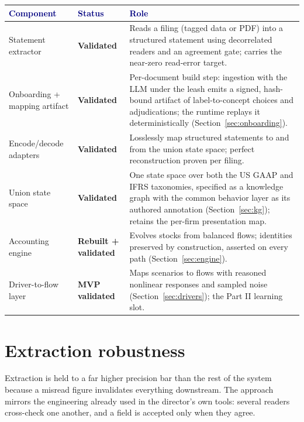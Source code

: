 \documentclass[11pt]{article}
\newcommand{\headtext}[1]{\textcolor{navy}{\textbf{#1}}}
\begin{document}
\noindent\begin{minipage}{\linewidth}
\renewcommand{\arraystretch}{1.12}
\begin{tabularx}{\linewidth}{>{\raggedright\arraybackslash}p{3.2cm} >{\raggedright\arraybackslash}p{2.6cm} X}
\hline
\rowcolor{tblhead} \headtext{Component} & \headtext{Status} & \headtext{Role} \\ \hline
Statement extractor & \textbf{\textcolor{fgreen}{Validated}} & Reads a filing (tagged data or PDF) into a structured statement using decorrelated readers and an agreement gate; carries the near-zero read-error target. \\ \hline
Onboarding + mapping artifact & \textbf{\textcolor{fgreen}{Validated}} & Per-document build step: ingestion with the LLM under the leash emits a signed, hash-bound artifact of label-to-concept choices and adjudications; the runtime replays it deterministically (Section~\ref{sec:onboarding}). \\ \hline
Encode/decode adapters & \textbf{\textcolor{fgreen}{Validated}} & Losslessly map structured statements to and from the union state space; perfect reconstruction proven per filing. \\ \hline
Union state space & \textbf{\textcolor{fgreen}{Validated}} & One state space over both the US GAAP and IFRS taxonomies, specified as a knowledge graph with the common behavior layer as its authored annotation (Section~\ref{sec:kg}); retains the per-firm presentation map. \\ \hline
Accounting engine & \textbf{\textcolor{fgreen}{Rebuilt + validated}} & Evolves stocks from balanced flows; identities preserved by construction, asserted on every path (Section~\ref{sec:engine}). \\ \hline
Driver-to-flow layer & \textbf{\textcolor{fgreen}{MVP validated}} & Maps scenarios to flows with reasoned nonlinear responses and sampled noise (Section~\ref{sec:drivers}); the Part II learning slot. \\ \hline
\end{tabularx}
\label{tab:components}
\end{minipage}

\section{Extraction robustness}
\label{sec:robustness}
Extraction is held to a far higher precision bar than the rest of the system because a misread figure invalidates everything downstream. The approach mirrors the engineering already used in the director's own tools: several readers cross-check one another, and a field is accepted only when they agree.
\end{document}

